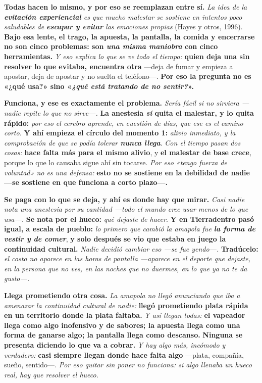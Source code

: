 \documentclass[11pt,letterpaper]{article}
\newcommand{\milcpaso}[3]{%
\Needspace{4\baselineskip}%
\begin{tcolorbox}[enhanced,colback=white,colframe=milcLinea,arc=1.5mm,boxrule=.9pt,
  left=14mm,right=4mm,top=3mm,bottom=3mm,before skip=4pt,after skip=4pt,
  fontupper=\RaggedRight,
  overlay={\node[anchor=north west,circle,fill=#2,text=white,inner sep=0pt,
    minimum size=7.4mm,font=\sffamily\bfseries\small]
    at ([xshift=3.6mm,yshift=-3.2mm]frame.north west) {#1};}]
#3
\end{tcolorbox}}
\begin{document}
\milcpaso{1}{milcTurquesa}{\textbf{Todas hacen lo mismo, y por eso se reemplazan entre sí.} \emph{La idea de la \textbf{evitación experiencial} es que mucho malestar se sostiene en intentos poco saludables de \textbf{escapar y evitar} las emociones propias} (Hayes y otros, 1996). \textbf{Bajo esa lente, el trago, la apuesta, la pantalla, la comida y encerrarse no son cinco problemas: son \emph{una misma maniobra} con cinco herramientas.} \emph{Y eso explica lo que se ve todo el tiempo:} \textbf{quien deja una sin resolver lo que evitaba, encuentra otra} ---deja de fumar y empieza a apostar, deja de apostar y no suelta el teléfono---. \textbf{Por eso la pregunta no es «¿qué usa?» sino «\emph{¿qué está tratando de no sentir?}».}}
\milcpaso{2}{milcTurquesa}{\textbf{Funciona, y ese es exactamente el problema.} \emph{Sería fácil si no sirviera ---nadie repite lo que no sirve---.} \textbf{La anestesia \emph{sí} quita el malestar, y lo quita rápido:} \emph{por eso el cerebro aprende, en cuestión de días, que ese es el camino corto.} \textbf{Y ahí empieza el círculo del momento 1:} \emph{alivio inmediato, y la comprobación de que se podía tolerar \textbf{nunca llega}}. \emph{Con el tiempo pasan dos cosas:} \textbf{hace falta más para el mismo alivio}, y \textbf{el malestar de base crece}, porque lo que lo causaba sigue ahí sin tocarse. \emph{Por eso «tengo fuerza de voluntad» no es una defensa:} \textbf{esto no se sostiene en la debilidad de nadie ---se sostiene en que funciona a corto plazo---.}}
\milcpaso{3}{milcTurquesa}{\textbf{Se paga con lo que se deja, y ahí es donde hay que mirar.} \emph{Casi nadie nota una anestesia por su cantidad ---todo el mundo cree usar menos de lo que usa---.} \textbf{Se nota por el hueco:} \emph{qué dejaste de hacer}. \textbf{Y en Tierradentro pasó igual, a escala de pueblo:} \emph{lo primero que cambió la amapola fue \textbf{la forma de vestir y de comer}}, \textbf{y solo después se vio que estaba en juego la continuidad cultural.} \emph{Nadie decidió cambiar eso ---se fue yendo---.} \textbf{Tradúcelo:} \emph{el costo no aparece en las horas de pantalla ---aparece en el deporte que dejaste, en la persona que no ves, en las noches que no duermes, en lo que ya no te da gusto---.}}
\milcpaso{4}{milcTurquesa}{\textbf{Llega prometiendo otra cosa.} \emph{La amapola no llegó anunciando que iba a amenazar la continuidad cultural de nadie:} \textbf{llegó prometiendo plata rápida en un territorio donde la plata faltaba.} \emph{Y así llegan todas:} \textbf{el vapeador llega como algo inofensivo y de sabores; la apuesta llega como una forma de ganarse algo; la pantalla llega como descanso.} \textbf{Ninguna se presenta diciendo lo que va a cobrar.} \emph{Y hay algo más, incómodo y verdadero:} \textbf{casi siempre llegan donde hace falta algo} ---plata, compañía, sueño, sentido---. \emph{Por eso quitar sin poner no funciona: si algo llenaba un hueco real, hay que resolver el hueco.}}
\end{document}
